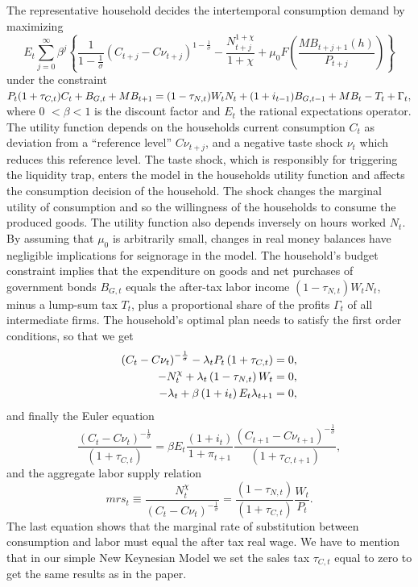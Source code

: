 \documentclass[12pt,a4paper,oneside,titlepage]{article}
\begin{document}
The representative household decides the intertemporal consumption demand by maximizing
\begin{equation}
E_t \sum_{j=0}^\infty \beta^j \left\{ \frac{1}{1- \frac{1}{\sigma}} \left(C_{t+j} - C\nu_{t+j}\right)^{1-\frac{1}{\sigma}} - \frac{N_{t+j}^{1+\chi}}{1+\chi} + \mu_0F \left(\frac{MB_{t+j+1}(h)}{P_{t+j}}\right)\right\} \nonumber
\end{equation}
under the constraint\newline
$P_t(1+\tau_{C,t})C_t + B_{G,t} + MB_{t+1} = (1-\tau_{N,t})W_tN_t + (1+i_{t-1})B_{G,t-1} + MB_t - T_t + \Gamma_t, \vspace{0.2cm}$
where 0 $< \beta < 1$ is the discount factor and $E_t$ the rational expectations operator. The utility function depends on the households current consumption $C_t$ as deviation from a “reference level” $C\nu_{t+j}$, and a negative taste shock $\nu_t$ which reduces this reference level. The taste shock, which is responsibly for triggering the liquidity trap, enters the model in the households utility function and affects the consumption decision of the household. The shock changes the marginal utility of consumption and so the willingness of the households to consume the produced goods.\newline
The utility function also depends inversely on hours worked $N_t$. By assuming that $\mu_0$ is arbitrarily small, changes in real money balances have negligible implications for seignorage in the model. The household's budget constraint implies that the expenditure on goods and net purchases of government bonds $B_{G,t}$ equals the after-tax labor income $ \left(1 - \tau_{N,t} \right) W_tN_t$, minus a lump-sum tax $T_t$, plus a proportional share of the profits $\Gamma_t$ of all intermediate firms. The household's optimal plan needs to satisfy the first order conditions, so that we get
\begin{align}
\vspace{-0.5cm} \left(C_t - C\nu_t\right)^{-\frac{1}{\sigma}}  - \lambda_tP_t \left(1 + \tau_{C,t} \right) = 0,\nonumber\\
-N_t^{\chi} + \lambda_t \left(1 - \tau_{N,t} \right) W_t = 0,\nonumber\\
-\lambda_t + \beta \left(1 + i_t \right) E_t\lambda_{t+1} = 0,\nonumber
\end{align}
and finally the Euler equation
\begin{equation}
\frac {\left(C_t - C\nu_t\right)^{-\frac{1}{\sigma}}}{\left(1 + \tau_{C,t} \right)} = \beta E_t \frac{\left(1 + i_t \right)}{1 + \pi_{t+1}} \frac{\left(C_{t+1} - C\nu_{t+1}\right)^{-\frac{1}{\sigma}}}{\left(1+ \tau_{C,t+1}\right)},
\end{equation}
and the aggregate labor supply relation
\begin{equation}
mrs_t \equiv \frac{N_t^\chi}{\left(C_t - C\nu_t\right)^{-\frac{1}{\sigma}}} = \frac{\left(1 - \tau_{N,t}\right)}{\left(1 + \tau_{C,t}\right)} \frac{W_t}{P_t}.
\end{equation}
The last equation shows that the marginal rate of substitution between consumption and labor must equal the after tax real wage.
We have to mention that in our simple New Keynesian Model we set the sales tax $\tau_{C,t}$ equal to zero to get the same results as in the paper.
\end{document}

